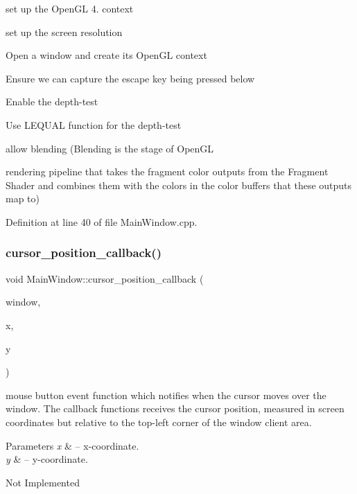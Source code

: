 set up the Open\+GL 4. context

set up the screen resolution

Open a window and create its Open\+GL context

Ensure we can capture the escape key being pressed below

Enable the depth-\/test

Use L\+E\+Q\+U\+AL function for the depth-\/test \begin{DoxyVerb}                 allow blending (Blending is the stage of OpenGL 
\end{DoxyVerb}
 rendering pipeline that takes the fragment color outputs from the Fragment Shader and combines them with the colors in the color buffers that these outputs map to)

Definition at line 40 of file Main\+Window.\+cpp.

\mbox{\label{class_main_window_aa3b1ac9b22345bb7099347cf42f66ad5}} 
\subsubsection{\texorpdfstring{cursor\+\_\+position\+\_\+callback()}{cursor\_position\_callback()}}
{\footnotesize\ttfamily void Main\+Window\+::cursor\+\_\+position\+\_\+callback (\begin{DoxyParamCaption}\item[{G\+L\+F\+Wwindow $\ast$}]{window,  }\item[{double}]{x,  }\item[{double}]{y }\end{DoxyParamCaption})\hspace{0.3cm}{\ttfamily [static]}}



mouse button event function which notifies when the cursor moves over the window. The callback functions receives the cursor position, measured in screen coordinates but relative to the top-\/left corner of the window client area. 


\begin{DoxyParams}{Parameters}
{\em x} & -- x-\/coordinate. \\
\hline
{\em y} & -- y-\/coordinate. \\
\hline
\end{DoxyParams}
Not Implemented 

